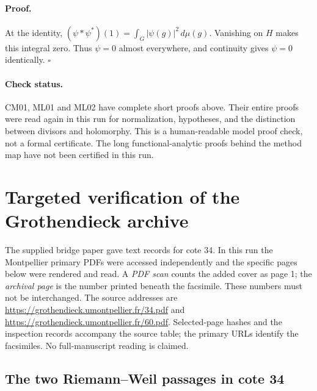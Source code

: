 \documentclass[11pt,a4paper]{article}
\theoremstyle{definition}
\begin{document}
\paragraph{Proof.}
At the identity,
$(\psi*\psi^*)(1)=\int_G|\psi(g)|^2\,d\mu(g)$.
Vanishing on $H$ makes this integral zero. Thus $\psi=0$ almost everywhere,
and continuity gives $\psi=0$ identically. \hfill$\square$

\paragraph{Check status.}
CM01, ML01 and ML02 have complete short proofs above. Their entire proofs
were read again in this run for normalization, hypotheses, and the
distinction between divisors and holomorphy. This is a human-readable
model proof check, not a formal certificate. The long functional-analytic
proofs behind the method map have not been certified in this run.


\section{Targeted verification of the Grothendieck archive}
\label{sec:archive-verification}

The supplied bridge paper gave text records for cote 34.  In this run the
Montpellier primary PDFs were accessed independently and the specific pages
below were rendered and read.  A \emph{PDF scan} counts the added cover as
page 1; the \emph{archival page} is the number printed beneath the facsimile.
These numbers must not be interchanged.  The source addresses are
\url{https://grothendieck.umontpellier.fr/34.pdf} and
\url{https://grothendieck.umontpellier.fr/60.pdf}.
Selected-page hashes and the inspection records accompany
the source table; the primary URLs identify the facsimiles.  No full-manuscript reading is claimed.

\subsection{The two Riemann--Weil passages in cote 34}
\end{document}
